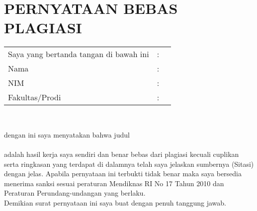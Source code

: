 % 

% 

\chapter*{PERNYATAAN BEBAS PLAGIASI}

\vspace*{0.4cm}
\noindent

\noindent
\begin{tabular}{ll p{9cm}}
	Saya yang bertanda tangan di bawah ini&: & \vspace*{0.5cm} \\
	\hspace*{1cm} Nama&: & \penulis \\
	\hspace*{1cm} NIM&: & \nim \\
	\hspace*{1cm} Fakultas/Prodi&: & \fakultas \\
\end{tabular} \\
\vspace*{0.4cm}

dengan ini saya menyatakan bahwa judul \tipeCapitalize \\
\textbf{\Judul} \vspace*{0.3cm} \\
adalah hasil kerja saya sendiri dan benar bebas dari plagiasi kecuali cuplikan
serta ringkasan yang terdapat di dalamnya telah saya jelaskan sumbernya
(Sitasi) dengan jelas. Apabila pernyataan ini terbukti tidak benar maka saya
bersedia menerima sanksi sesuai peraturan Mendiknas RI No 17 Tahun 2010
dan Peraturan Perundang-undangan yang berlaku. \vspace*{0.3cm}\\
Demikian surat pernyataan ini saya buat dengan penuh tanggung jawab. \vspace*{1cm}\\

\begin{flushright}
\end{flushright}
